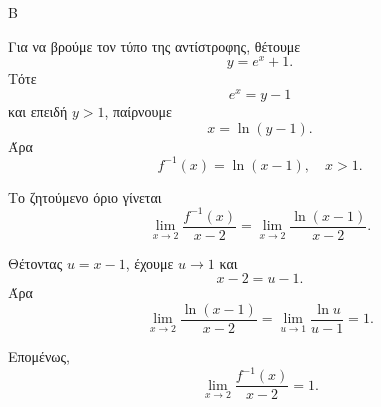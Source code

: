 \begin{thema}{Β}
\begin{erwthma}
Για να βρούμε τον τύπο της αντίστροφης, θέτουμε
\[
y=e^x+1.
\]
Τότε
\[
e^x=y-1
\]
και επειδή $y>1$, παίρνουμε
\[
x=\ln(y-1).
\]
Άρα
\[
f^{-1}(x)=\ln(x-1),\quad x>1.
\]

Το ζητούμενο όριο γίνεται
\[
\lim_{x\to 2}\frac{f^{-1}(x)}{x-2}
=\lim_{x\to 2}\frac{\ln(x-1)}{x-2}.
\]

Θέτοντας $u=x-1$, έχουμε $u\to 1$ και
\[
x-2=u-1.
\]
Άρα
\[
\lim_{x\to 2}\frac{\ln(x-1)}{x-2}
=\lim_{u\to 1}\frac{\ln u}{u-1}
=1.
\]

Επομένως,
\[
\lim_{x\to 2}\frac{f^{-1}(x)}{x-2}=1.
\]
\end{erwthma}
\end{thema}



